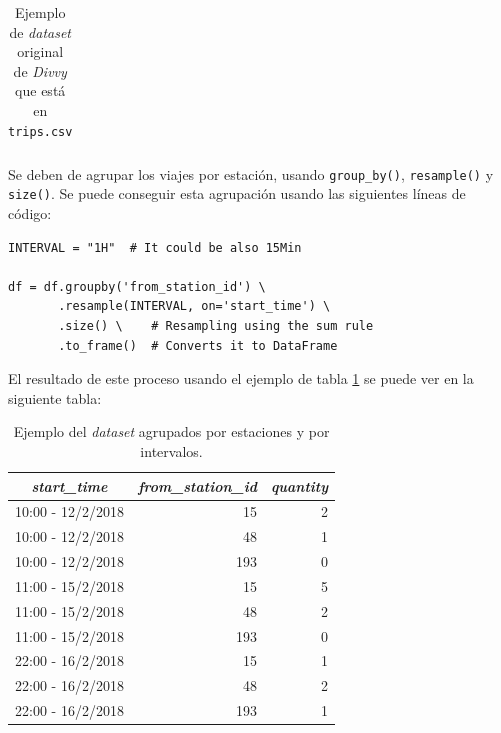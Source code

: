 \begin{enumerate}
\begin{table}[H]
\begin{tabular}{c|rr}
    \end{tabular}
    \cprotect\caption{Ejemplo de \textit{dataset} original de \textit{Divvy} que está en \small{\verb|trips.csv|}}
    \label{tab:starttime_withsid}
    \end{table}
    
    Se deben de agrupar los viajes por estación, usando \small{\verb|group_by()|},  \small{\verb|resample()|} y \small{\verb|size()|}. Se puede conseguir esta agrupación usando las siguientes líneas de código:
    
    \begin{verbatim}
INTERVAL = "1H"  # It could be also 15Min

df = df.groupby('from_station_id') \
       .resample(INTERVAL, on='start_time') \
       .size() \    # Resampling using the sum rule
       .to_frame()  # Converts it to DataFrame
    \end{verbatim}
    
    El resultado de este proceso usando el ejemplo de tabla \ref{tab:starttime_withsid} se puede ver en la siguiente tabla:
    
    \begin{table}[H]
    \footnotesize
    \centering
    \begin{tabular}{c|rr}
        \toprule
          \textit{start\_time} & \textit{from\_station\_id} & \textit{quantity}  \\
        \midrule
        
        10:00 - 12/2/2018 & 15 & 2\\
        10:00 - 12/2/2018 & 48 & 1\\
        10:00 - 12/2/2018 & 193 & 0\\
        11:00 - 15/2/2018 & 15 & 5\\
        11:00 - 15/2/2018 & 48 & 2\\
        11:00 - 15/2/2018 & 193 & 0\\
        22:00 - 16/2/2018 & 15 & 1\\
        22:00 - 16/2/2018 & 48 & 2\\
        22:00 - 16/2/2018 & 193 & 1\\
        \bottomrule
    \end{tabular}
    \cprotect\caption{Ejemplo del \textit{dataset} agrupados por estaciones y por intervalos.}
    \label{tab:justintervals}
    \end{table}
    
    


\end{enumerate}
